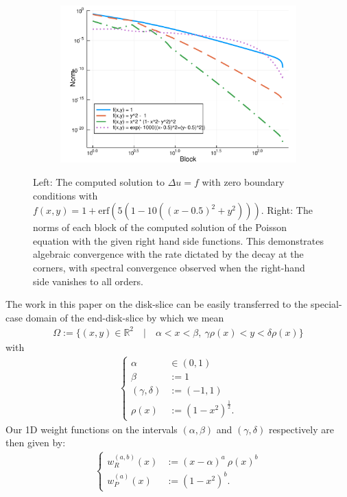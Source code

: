 \documentclass[11pt, oneside]{article}   	%
\newcommand{\half}{\frac{1}{2}}
\newcommand{\R}{\mathbb{R}}
\newcommand{\genjac}{R}
\newcommand{\genjacw}{w_\genjac}
\newcommand{\jacw}{w_P}
\begin{document}
\begin{figure}[t]
	\begin{subfigure}{0.5\textwidth}
	\centering
	\includegraphics[scale=0.5]{solutionblocknorms-poisson}
	\end{subfigure}
	\caption{Left: The computed solution to $\Delta u = f$ with zero boundary conditions with $f(x,y) = 1 + \text{erf}(5(1 - 10((x - 0.5)^2 + y^2)))$. Right: The norms of each block of the computed solution of the Poisson equation with the given right hand side functions. This demonstrates algebraic convergence with the rate dictated by the decay at the corners, with spectral convergence observed when the right-hand side vanishes to all orders.}
	\centering
	\label{fig:poisson}
\end{figure}

The work in this paper on the disk-slice can be easily transferred to the special-case domain of the end-disk-slice by which we mean
\begin{align*}
	\Omega := \{(x,y) \in \R^2 \quad | \quad \alpha < x < \beta, \: \gamma \rho(x) < y < \delta \rho(x)\}
\end{align*}
with
\begin{align*}
\begin{cases}
\alpha &\in (0,1) \\
\beta &:= 1 \\
(\gamma, \delta) &:= (-1,1) \\
\rho(x) &:= (1-x^2)^{\half}.
\end{cases}
\end{align*}
Our 1D weight functions on the intervals $(\alpha, \beta)$ and $(\gamma, \delta)$ respectively are then given by:
\begin{align*}
\begin{cases}
\genjacw^{(a,b)}(x) &:= (x - \alpha)^{a} \: \rho(x)^{b} \\
\jacw^{(a)}(x) &:= (1-x^2)^b.
\end{cases}
\end{align*}
\end{document}
